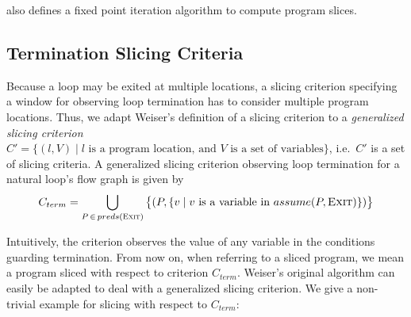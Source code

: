 \citeauthor{DBLP:conf/icse/Weiser81} \cite{DBLP:conf/icse/Weiser81} also defines a fixed point iteration algorithm to compute program slices.

\subsection{Termination Slicing Criteria}

Because a loop may be exited at multiple locations, a slicing criterion specifying a window for observing loop termination has to consider multiple program locations. Thus, we adapt Weiser's definition of a slicing criterion to a \emph{generalized slicing criterion} $C' = \{ (l, V) \mid l \text{ is a program location, and } V \text{ is a set of variables} \}$, i.e.\ $C'$ is a set of slicing criteria. A generalized slicing criterion observing loop termination for a natural loop's flow graph is given by
\[
    C_{term} = \bigcup \limits_{P\,\in\,preds(\textsc{Exit})} \big\{ (P, \{ v \mid v \text{ is a variable in } assume(P, \textsc{Exit}) \}) \big\}
\]

Intuitively, the criterion observes the value of any variable in the conditions guarding termination. From now on, when referring to a sliced program, we mean a program sliced with respect to criterion $C_{term}$. Weiser's original algorithm can easily be adapted to deal with a generalized slicing criterion. We give a non-trivial example for slicing with respect to $C_{term}$:

